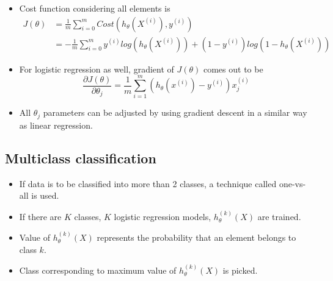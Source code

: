 \documentclass{article}
\begin{document}
\begin{itemize}
\begin{equation*}
\begin{array}{l}
			-log(1-h_\theta(X))\ \ \ \ \text{if $y=0$}\\
		\end{array}\right.
	\end{equation*}
	Here, if $y=1$, cost is $-log(h_\theta(X))$, which is 0 if $h_\theta(X)=1$, and tends to infinity if $h_\theta(X)=0$. Similarly for $y=0$.
	\item Cost function considering all elements is \begin{align*}
		J(\theta) &= \frac{1}{m} \sum_{i=0}^m Cost(h_\theta(X^{(i)}),y^{(i)})\\
		&= -\frac{1}{m} \sum_{i=0}^m y^{(i)}log(h_\theta(X^{(i)})) + (1-y^{(i)})log(1-h_\theta(X^{(i)}))
	\end{align*}
	\item For logistic regression as well, gradient of $J(\theta)$ comes out to be
	$$\frac{\partial J(\theta)}{\partial \theta_j}=\frac{1}{m} \sum_{i=1}^{m} (h_\theta(x^{(i)})-y^{(i)})x_j^{(i)}$$
	\item All $\theta_j$ parameters can be adjusted by using gradient descent in a similar way as linear regression.
\end{itemize}
\subsection{Multiclass classification}
\begin{itemize}
	\item If data is to be classified into more than 2 classes, a technique called one-vs-all is used.
	\item If there are $K$ classes, $K$ logistic regression models, $h^{(k)}_\theta(X)$ are trained.
	\item Value of  $h^{(k)}_\theta(X)$ represents the probability that an element belongs to class $k$.
	\item Class corresponding to maximum value of $h^{(k)}_\theta(X)$ is picked.
\end{itemize}
\end{document}

